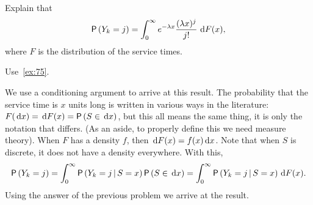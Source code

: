 \documentclass[companion]{subfiles}
\begin{document}
\begin{exercise}
 Explain that 
\begin{equation}\label{eq:10}
 \P{Y_k = j} = \int_0^\infty e^{-\lambda x}\frac{(\lambda x)^j}{j!}\, \d F(x),
\end{equation}
where $F$ is the distribution of the service times.
\begin{hint}
 Use~\cref{ex:75}.
\end{hint}
\begin{solution}
 We use a conditioning argument to arrive at this result. The
 probability that the service time is $x$ units long is written in
 various ways in the literature: $F(\d x) = \d F(x) = \P{S\in \d x}$,
 but this all means the same thing, it is only the notation that
 differs. (As an aside, to properly define this we need measure
 theory). When $F$ has a density $f$, then
 $\,\text{d}F(x) = f(x) \,\text{d}x$. Note that when $S$ is discrete, it does not
 have a density everywhere. With this,
 \begin{equation*}
 \P{Y_k=j} = \int_0^\infty \P{Y_k =j\given S=x}\P{S\in \d x} =
 \int_0^\infty \P{Y_k =j\given S=x} \d F(x).
 \end{equation*}
 Using the answer of the previous problem we arrive at the result.
\end{solution}
\end{exercise}
\end{document}
